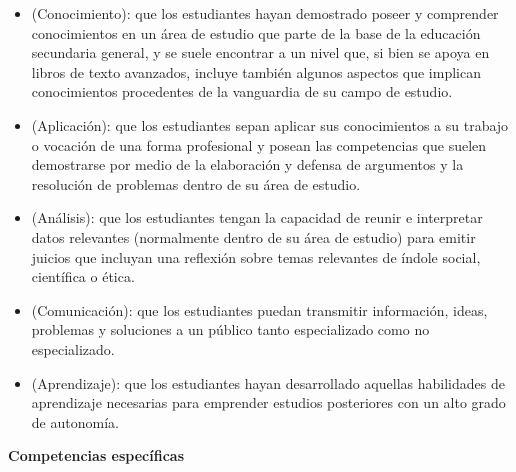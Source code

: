\begin{itemize}
\item (Conocimiento): que los estudiantes hayan demostrado poseer y comprender conocimientos en un área de estudio que parte de la base de la educación secundaria general, y se suele encontrar a un nivel que, si bien se apoya en libros de texto avanzados, incluye también algunos aspectos que implican conocimientos procedentes de la vanguardia de su campo de estudio.

\item (Aplicación): que los estudiantes sepan aplicar sus conocimientos a su trabajo o vocación de una forma profesional y posean las competencias que suelen demostrarse por medio de la elaboración y defensa de argumentos y la resolución de problemas dentro de su área de estudio.

\item (Análisis): que los estudiantes tengan la capacidad de reunir e interpretar datos relevantes (normalmente dentro de su área de estudio) para emitir juicios que incluyan una reflexión sobre temas relevantes de índole social, científica o ética.

\item (Comunicación): que los estudiantes puedan transmitir información, ideas, problemas y soluciones a un público tanto especializado como no especializado.

\item (Aprendizaje): que los estudiantes hayan desarrollado aquellas habilidades de aprendizaje necesarias para emprender estudios posteriores con un alto grado de autonomía.
\end{itemize}

\textbf{Competencias específicas}


